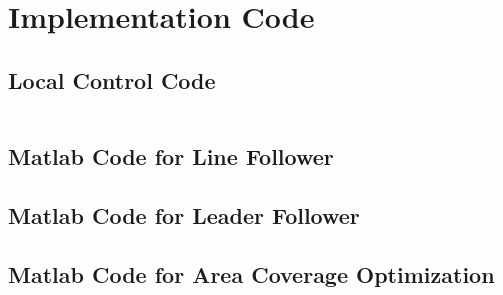 \chapter{Implementation Code}
\label{ch:Appendix-Implementation-Code} 
\section{Local Control Code}


\begin{mdframed}[backgroundcolor=yellow!5, roundcorner=10pt,outerlinecolor= blue!70!black,outerlinewidth=1.2,frametitle=Test code.c]
\inputminted[linenos=true]{c}{code/CCode/test.c}
\end{mdframed}


\section{Matlab Code for Line Follower}

\section{Matlab Code for Leader Follower}

\section{Matlab Code for Area Coverage Optimization}


